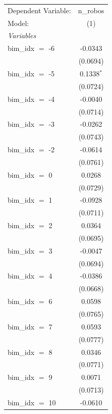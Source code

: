 
\begingroup
\centering
\begin{tabular}{lc}
   \tabularnewline \midrule \midrule
   Dependent Variable: & n\_robos\\   
   Model:              & (1)\\  
   \midrule
   \emph{Variables}\\
   bim\_idx $=$ -6     & -0.0343\\   
                       & (0.0694)\\   
   bim\_idx $=$ -5     & 0.1338$^{*}$\\   
                       & (0.0724)\\   
   bim\_idx $=$ -4     & -0.0040\\   
                       & (0.0714)\\   
   bim\_idx $=$ -3     & -0.0262\\   
                       & (0.0743)\\   
   bim\_idx $=$ -2     & -0.0614\\   
                       & (0.0761)\\   
   bim\_idx $=$ 0      & 0.0268\\   
                       & (0.0729)\\   
   bim\_idx $=$ 1      & -0.0928\\   
                       & (0.0711)\\   
   bim\_idx $=$ 2      & 0.0364\\   
                       & (0.0695)\\   
   bim\_idx $=$ 3      & -0.0047\\   
                       & (0.0694)\\   
   bim\_idx $=$ 4      & -0.0386\\   
                       & (0.0668)\\   
   bim\_idx $=$ 6      & 0.0598\\   
                       & (0.0765)\\   
   bim\_idx $=$ 7      & 0.0593\\   
                       & (0.0777)\\   
   bim\_idx $=$ 8      & 0.0346\\   
                       & (0.0771)\\   
   bim\_idx $=$ 9      & 0.0071\\   
                       & (0.0713)\\   
   bim\_idx $=$ 10     & -0.0610\\   

\end{tabular}
